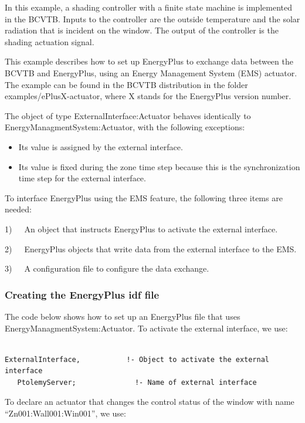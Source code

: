 In this example, a shading controller with a finite state machine is implemented in the BCVTB. Inputs to the controller are the outside temperature and the solar radiation that is incident on the window. The output of the controller is the shading actuation signal.

This example describes how to set up EnergyPlus to exchange data between the BCVTB and EnergyPlus, using an Energy Management System (EMS) actuator. The example can be found in the BCVTB distribution in the folder examples/ePlusX-actuator, where X stands for the EnergyPlus version number.

The object of type ExternalInterface:Actuator behaves identically to EnergyManagmentSystem:Actuator, with the following exceptions:

\begin{itemize}
\item
  Its value is assigned by the external interface.
\item
  Its value is fixed during the zone time step because this is the synchronization time step for the external interface.
\end{itemize}

To interface EnergyPlus using the EMS feature, the following three items are needed:

1)~~~An object that instructs EnergyPlus to activate the external interface.

2)~~~EnergyPlus objects that write data from the external interface to the EMS.

3)~~~A configuration file to configure the data exchange.

\subsubsection{Creating the EnergyPlus idf file}\label{creating-the-energyplus-idf-file-1}

The code below shows how to set up an EnergyPlus file that uses EnergyManagmentSystem:Actuator. To activate the external interface, we use:

\begin{lstlisting}

ExternalInterface,           !- Object to activate the external interface
   PtolemyServer;              !- Name of external interface
\end{lstlisting}

To declare an actuator that changes the control status of the window with name ``Zn001:Wall001:Win001'', we use:

